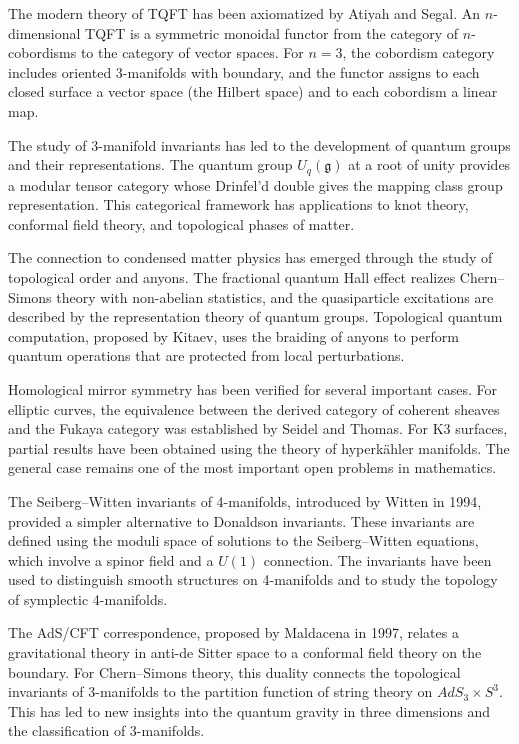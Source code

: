 The modern theory of TQFT has been axiomatized by Atiyah and Segal. An $n$-dimensional TQFT is a symmetric monoidal functor from the category of $n$-cobordisms to the category of vector spaces. For $n = 3$, the cobordism category includes oriented 3-manifolds with boundary, and the functor assigns to each closed surface a vector space (the Hilbert space) and to each cobordism a linear map.

The study of 3-manifold invariants has led to the development of quantum groups and their representations. The quantum group $U_q(\mathfrak{g})$ at a root of unity provides a modular tensor category whose Drinfel'd double gives the mapping class group representation. This categorical framework has applications to knot theory, conformal field theory, and topological phases of matter.

The connection to condensed matter physics has emerged through the study of topological order and anyons. The fractional quantum Hall effect realizes Chern--Simons theory with non-abelian statistics, and the quasiparticle excitations are described by the representation theory of quantum groups. Topological quantum computation, proposed by Kitaev, uses the braiding of anyons to perform quantum operations that are protected from local perturbations.

Homological mirror symmetry has been verified for several important cases. For elliptic curves, the equivalence between the derived category of coherent sheaves and the Fukaya category was established by Seidel and Thomas. For K3 surfaces, partial results have been obtained using the theory of hyperk\"ahler manifolds. The general case remains one of the most important open problems in mathematics.

The Seiberg--Witten invariants of 4-manifolds, introduced by Witten in 1994, provided a simpler alternative to Donaldson invariants. These invariants are defined using the moduli space of solutions to the Seiberg--Witten equations, which involve a spinor field and a $U(1)$ connection. The invariants have been used to distinguish smooth structures on 4-manifolds and to study the topology of symplectic 4-manifolds.

The AdS/CFT correspondence, proposed by Maldacena in 1997, relates a gravitational theory in anti-de Sitter space to a conformal field theory on the boundary. For Chern--Simons theory, this duality connects the topological invariants of 3-manifolds to the partition function of string theory on $AdS_3 \times S^3$. This has led to new insights into the quantum gravity in three dimensions and the classification of 3-manifolds.

